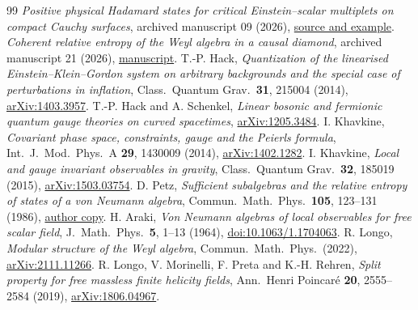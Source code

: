 \documentclass[11pt]{article}
\begin{document}
\begin{thebibliography}{99}
\emph{Positive physical Hadamard states for critical Einstein--scalar multiplets on compact Cauchy surfaces}, archived manuscript 09 (2026), \href{https://github.com/g3173028019-beep/ai-automated-quantum-gravity-research/tree/main/papers/09-canonical-einstein-scalar-hadamard}{source and example}.
\emph{Coherent relative entropy of the Weyl algebra in a causal diamond}, archived manuscript 21 (2026), \href{https://github.com/g3173028019-beep/ai-automated-quantum-gravity-research/blob/main/papers/21-weyl-diamond-relative-entropy/manuscript.md}{manuscript}.
T.-P. Hack, \emph{Quantization of the linearised Einstein--Klein--Gordon system on arbitrary backgrounds and the special case of perturbations in inflation}, Class.\ Quantum Grav.\ \textbf{31}, 215004 (2014), \href{https://arxiv.org/abs/1403.3957}{arXiv:1403.3957}.
T.-P. Hack and A. Schenkel, \emph{Linear bosonic and fermionic quantum gauge theories on curved spacetimes}, \href{https://arxiv.org/abs/1205.3484}{arXiv:1205.3484}.
I. Khavkine, \emph{Covariant phase space, constraints, gauge and the Peierls formula}, Int.\ J.\ Mod.\ Phys.\ A \textbf{29}, 1430009 (2014), \href{https://arxiv.org/abs/1402.1282}{arXiv:1402.1282}.
I. Khavkine, \emph{Local and gauge invariant observables in gravity}, Class.\ Quantum Grav.\ \textbf{32}, 185019 (2015), \href{https://arxiv.org/abs/1503.03754}{arXiv:1503.03754}.
D. Petz, \emph{Sufficient subalgebras and the relative entropy of states of a von Neumann algebra}, Commun.\ Math.\ Phys.\ \textbf{105}, 123--131 (1986), \href{https://math.bme.hu/~petz/pdf/29suff.pdf}{author copy}.
H. Araki, \emph{Von Neumann algebras of local observables for free scalar field}, J.\ Math.\ Phys.\ \textbf{5}, 1--13 (1964), \href{https://doi.org/10.1063/1.1704063}{doi:10.1063/1.1704063}.
R. Longo, \emph{Modular structure of the Weyl algebra}, Commun.\ Math.\ Phys.\ (2022), \href{https://arxiv.org/abs/2111.11266}{arXiv:2111.11266}.
R. Longo, V. Morinelli, F. Preta and K.-H. Rehren, \emph{Split property for free massless finite helicity fields}, Ann.\ Henri Poincar\'e \textbf{20}, 2555--2584 (2019), \href{https://arxiv.org/abs/1806.04967}{arXiv:1806.04967}.
\end{thebibliography}
\end{document}
